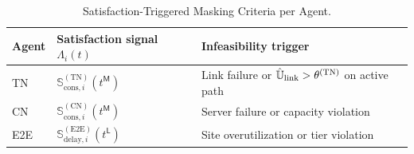 \documentclass[12pt,lettersize,journal,onecolumn]{IEEEtran}
\begin{document}
\begin{table}[t]
\centering
\small
\caption{Satisfaction-Triggered Masking Criteria per Agent.}
\label{tab:masking-criteria}
\begin{tabular}{@{}p{}p{}p{}@{}}
\toprule
\textbf{Agent} & \textbf{Satisfaction signal $\Lambda_i(t)$} & \textbf{Infeasibility trigger} \\ \midrule
TN  & $\mathbb{S}^{\mathrm{(TN)}}_{\mathrm{cons},i}(t^\mathsf{M})$ & Link failure or $\mathbb{\Hat{U}}_{\text{link}}>\theta^{(\mathrm{TN})}$ on active path \\ \addlinespace[0.5ex]
CN  & $\mathbb{S}^{\mathrm{(CN)}}_{\mathrm{cons},i}(t^\mathsf{M})$ & Server failure or capacity violation \\ \addlinespace[0.5ex]
E2E & $\mathbb{S}^{\mathrm{(E2E)}}_{\mathrm{delay},i}(t^\mathsf{L})$ & Site overutilization or tier violation \\ \bottomrule
\end{tabular}
\end{table}
\end{document}
